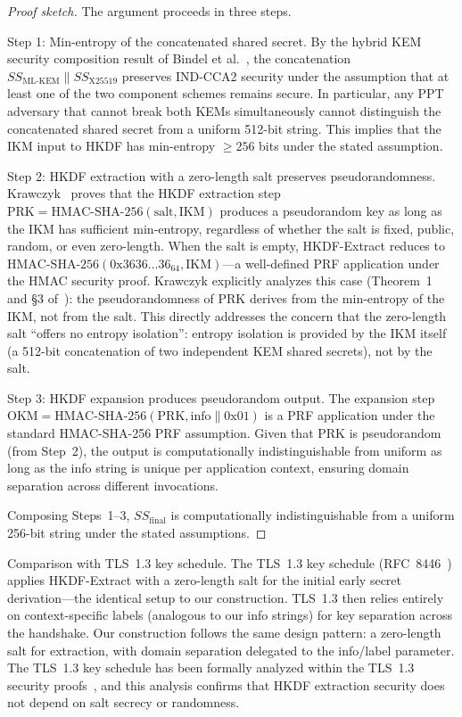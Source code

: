 \documentclass[11pt,a4paper]{article}
\def\textbf#1{#1}%
\def\emph#1{#1}%
\begin{document}
\begin{proof}[Proof sketch]
The argument proceeds in three steps.

\textbf{Step 1: Min-entropy of the concatenated shared secret.}
By the hybrid KEM security composition result of Bindel et al.~\cite{bindel2019hybrid}, the concatenation $SS_{\text{ML-KEM}} \| SS_{\text{X25519}}$ preserves IND-CCA2 security under the assumption that at least one of the two component schemes remains secure. In particular, any PPT adversary that cannot break both KEMs simultaneously cannot distinguish the concatenated shared secret from a uniform 512-bit string. This implies that the IKM input to HKDF has min-entropy $\geq 256$ bits under the stated assumption.

\textbf{Step 2: HKDF extraction with a zero-length salt preserves pseudorandomness.}
Krawczyk~\cite{krawczyk2010hkdf} proves that the HKDF extraction step $\text{PRK} = \text{HMAC-SHA-256}(\text{salt}, \text{IKM})$ produces a pseudorandom key as long as the IKM has sufficient min-entropy, \emph{regardless of whether the salt is fixed, public, random, or even zero-length}. When the salt is empty, HKDF-Extract reduces to $\text{HMAC-SHA-256}(\text{0x3636\ldots36}_{64}, \text{IKM})$---a well-defined PRF application under the HMAC security proof. Krawczyk explicitly analyzes this case (Theorem~1 and \S3 of~\cite{krawczyk2010hkdf}): the pseudorandomness of PRK derives from the min-entropy of the IKM, not from the salt. This directly addresses the concern that the zero-length salt ``offers no entropy isolation'': entropy isolation is provided by the IKM itself (a 512-bit concatenation of two independent KEM shared secrets), not by the salt.

\textbf{Step 3: HKDF expansion produces pseudorandom output.}
The expansion step $\text{OKM} = \text{HMAC-SHA-256}(\text{PRK}, \text{info} \| \text{0x01})$ is a PRF application under the standard HMAC-SHA-256 PRF assumption. Given that PRK is pseudorandom (from Step~2), the output is computationally indistinguishable from uniform as long as the info string is unique per application context, ensuring domain separation across different invocations.

Composing Steps~1--3, $SS_{\text{final}}$ is computationally indistinguishable from a uniform 256-bit string under the stated assumptions.
\end{proof}

\textbf{Comparison with TLS~1.3 key schedule.}
The TLS~1.3 key schedule (RFC~8446~\cite{rfc8446}) applies HKDF-Extract with a \emph{zero-length} salt for the initial early secret derivation---the \textbf{identical} setup to our construction. TLS~1.3 then relies entirely on context-specific labels (analogous to our info strings) for key separation across the handshake. Our construction follows the same design pattern: a zero-length salt for extraction, with domain separation delegated to the info/label parameter. The TLS~1.3 key schedule has been formally analyzed within the TLS~1.3 security proofs~\cite{rfc8446}, and this analysis confirms that HKDF extraction security does not depend on salt secrecy or randomness.
\end{document}
